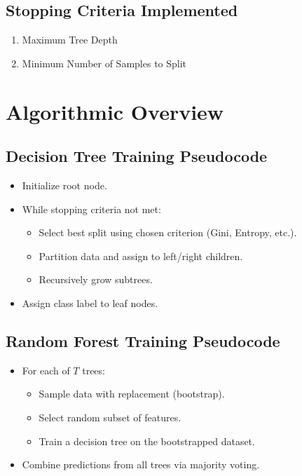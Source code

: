 \documentclass[11pt]{article}
\begin{document}
\subsection{Stopping Criteria Implemented}
\begin{enumerate}
    \item Maximum Tree Depth
    \item Minimum Number of Samples to Split
\end{enumerate}

\section{Algorithmic Overview}

\subsection{Decision Tree Training Pseudocode}

\begin{itemize}
    \item Initialize root node.
    \item While stopping criteria not met:
        \begin{itemize}
            \item Select best split using chosen criterion (Gini, Entropy, etc.).
            \item Partition data and assign to left/right children.
            \item Recursively grow subtrees.
        \end{itemize}
    \item Assign class label to leaf nodes.
\end{itemize}

\subsection{Random Forest Training Pseudocode}

\begin{itemize}
    \item For each of $T$ trees:
        \begin{itemize}
            \item Sample data with replacement (bootstrap).
            \item Select random subset of features.
            \item Train a decision tree on the bootstrapped dataset.
        \end{itemize}
    \item Combine predictions from all trees via majority voting.
\end{itemize}
\end{document}
